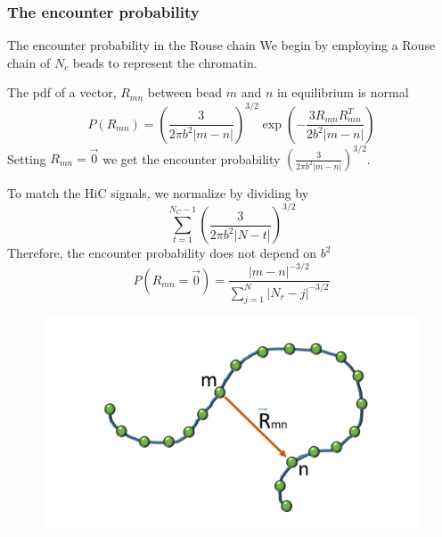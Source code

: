 \documentclass[8pt]{beamer}
\begin{document}
\subsubsection{The encounter probability}\label{subsubsection_theRouseEncounterProbability}
\begin{frame}{The encounter probability in the Rouse chain}
We begin by employing a Rouse chain of $N_c$ beads to represent the chromatin.

The pdf of a vector, $R_{mn}$ between bead $m$ and $n$ in equilibrium is normal
\begin{equation*}
P(R_{mn})=\left(\frac{3}{2\pi b^2 |m-n|}\right)^{3/2}\exp\left(-\frac{3R_{mn}R_{mn}^T}{2b^2|m-n|}\right)
\end{equation*}
Setting $R_{mn}=\vec{0}$ we get the encounter probability 
$\left(\frac{3}{2\pi b^2 |m-n|}\right)^{3/2}$. 

To match the HiC signals, we normalize by dividing by 
\begin{equation*}
\sum_{t=1}^{N_C-1}\left(\frac{3}{2\pi b^2 |N-t|}\right)^{3/2}
\end{equation*}
Therefore, the encounter probability does not depend on $b^2$ 
\begin{equation*}
P(R_{mn}=\vec{0})=\frac{|m-n|^{-3/2}}{\sum_{j=1}^{N} |N_r-j|^{-3/2}}
\end{equation*}

\begin{figure}[H]
\includegraphics[scale=0.12]{rouseChainVectorBetweenMAndN}
\end{figure}
\end{frame}
\end{document}

